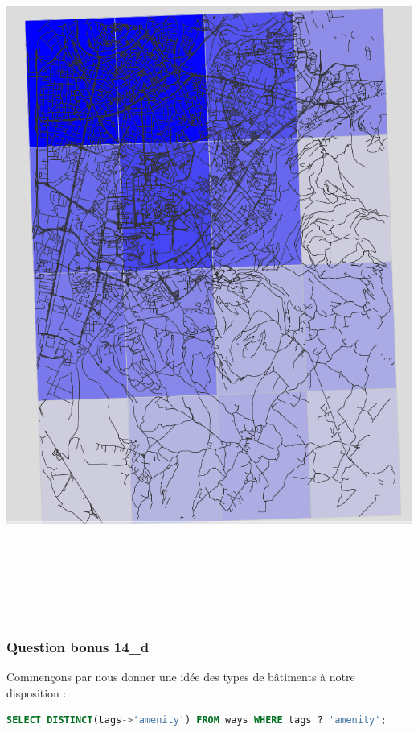 \documentclass[12pt,a4paper]{article}
\begin{document}
\includegraphics[height=23cm]{density_roads.png}

\subsubsection*{Question bonus 14\_d}

Commençons par nous donner une idée des types de bâtiments à notre disposition :

\begin{lstlisting}[language=SQL]
SELECT DISTINCT(tags->'amenity') FROM ways WHERE tags ? 'amenity';
\end{lstlisting}
\end{document}
